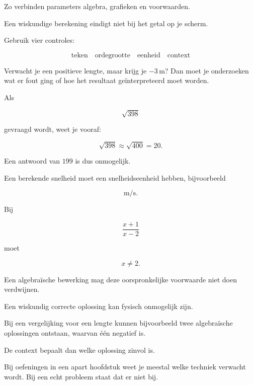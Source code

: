 \documentclass{ximera}
\begin{document}
Zo verbinden parameters algebra, grafieken en voorwaarden.



Een wiskundige berekening eindigt niet bij het getal op je scherm.

Gebruik vier controles:

\[
\boxed{
\text{teken}
\quad
\text{ordegrootte}
\quad
\text{eenheid}
\quad
\text{context}
}
\]



Verwacht je een positieve lengte, maar krijg je \(-3\,\mathrm m\)?
Dan moet je onderzoeken wat er fout ging of hoe het resultaat geïnterpreteerd moet worden.



Als

\[
\sqrt{398}
\]

gevraagd wordt, weet je vooraf:

\[
\sqrt{398}\approx\sqrt{400}=20.
\]

Een antwoord van \(199\) is dus onmogelijk.



Een berekende snelheid moet een snelheidseenheid hebben, bijvoorbeeld

\[
\mathrm{m/s}.
\]



Bij

\[
\frac{x+1}{x-2}
\]

moet

\[
x\neq2.
\]

Een algebraïsche bewerking mag deze oorspronkelijke voorwaarde niet doen verdwijnen.



Een wiskundig correcte oplossing kan fysisch onmogelijk zijn.

Bij een vergelijking voor een lengte kunnen bijvoorbeeld twee algebraïsche oplossingen ontstaan,
waarvan één negatief is.

De context bepaalt dan welke oplossing zinvol is.



Bij oefeningen in een apart hoofdstuk weet je meestal welke techniek verwacht wordt.
Bij een echt probleem staat dat er niet bij.
\end{document}
